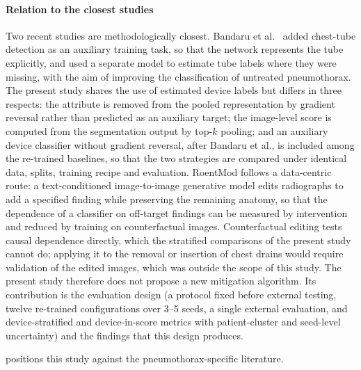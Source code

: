 \documentclass{ieeeaccess}
\begin{document}
\paragraph{Relation to the closest studies}
Two recent studies are methodologically closest. Bandaru et al.~\cite{bandaru2026untreated} added chest-tube detection as an auxiliary training task, so that the network represents the tube explicitly, and used a separate model to estimate tube labels where they were missing, with the aim of improving the classification of untreated pneumothorax. The present study shares the use of estimated device labels but differs in three respects: the attribute is removed from the pooled representation by gradient reversal rather than predicted as an auxiliary target; the image-level score is computed from the segmentation output by top-$k$ pooling; and an auxiliary device classifier without gradient reversal, after Bandaru et al., is included among the re-trained baselines, so that the two strategies are compared under identical data, splits, training recipe and evaluation. RoentMod \cite{cooke2026roentmod} follows a data-centric route: a text-conditioned image-to-image generative model edits radiographs to add a specified finding while preserving the remaining anatomy, so that the dependence of a classifier on off-target findings can be measured by intervention and reduced by training on counterfactual images. Counterfactual editing tests causal dependence directly, which the stratified comparisons of the present study cannot do; applying it to the removal or insertion of chest drains would require validation of the edited images, which was outside the scope of this study. The present study therefore does not propose a new mitigation algorithm. Its contribution is the evaluation design (a protocol fixed before external testing, twelve re-trained configurations over 3--5 seeds, a single external evaluation, and device-stratified and device-in-score metrics with patient-cluster and seed-level uncertainty) and the findings that this design produces.

 positions this study against the pneumothorax-specific literature.
\end{document}
